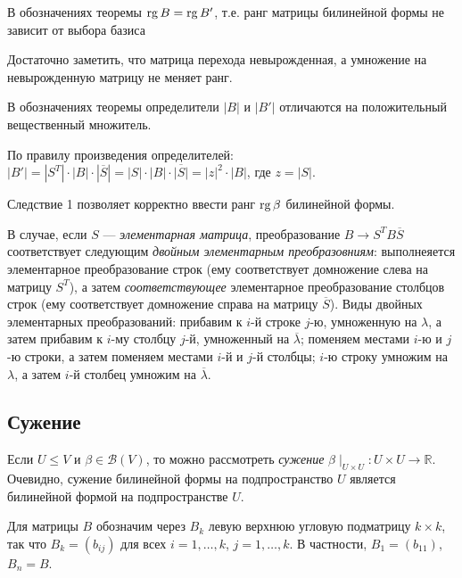 \begin{sled1}
В обозначениях теоремы $\mathop{\rm rg}\nolimits B = \mathop{\rm rg}\nolimits B'$, т.е. ранг матрицы билинейной формы не зависит от выбора базиса
\end{sled1}
\dok 
Достаточно заметить, что матрица перехода невырожденная, а умножение на невырожденную матрицу не меняет ранг.
\edok

\begin{sled2}
В обозначениях теоремы определители $|B|$ и $|B'|$ отличаются на положительный вещественный множитель.
\end{sled2}
\dok 
По правилу произведения определителей: 
 $|B'|=|S^T|\cdot |B| \cdot |\overline{S}|  = |S|\cdot |B| \cdot \overline{|S|} = |z|^2 \cdot |B|$, где $z=|S|$.
\edok

Следствие 1 позволяет корректно ввести ранг $\mathop{\rm rg}\nolimits \beta$ билинейной формы.

В случае, если $S$ --- {\it элементарная матрица}, преобразование $B\to S^TB\overline{S}$ соответствует 
следующим {\it двойным элементарным преобразовниям}: выполнеяется элементарное преобразование строк (ему соответствует домножение слева на матрицу $S^T$),
а затем {\it соответствующее} элементарное преобразование столбцов строк (ему соответствует домножение справа на матрицу $\overline{S}$).
Виды двойных элементарных преобразований: прибавим к $i$-й строке $j$-ю, умноженную на $\lambda$, 
 а затем прибавим к $i$-му столбцу $j$-й, умноженный на $\overline{\lambda}$;
поменяем местами $i$-ю и $j$-ю строки, а затем поменяем местами $i$-й и $j$-й столбцы; 
$i$-ю строку умножим на $\lambda$, а затем $i$-й столбец умножим на $\overline{\lambda}$.



\subsection{Сужение}

Если $U\leq V$ и $\beta \in \mathcal{B} (V)$, то можно рассмотреть {\it сужение} 
$\beta \mid_{U\times U}: U\times U \to \mathbb{R}$. %
Очевидно, сужение билинейной формы на подпространство $U$ является билинейной формой на подпространстве $U$.

Для матрицы $B$ обозначим через $B_k$ левую верхнюю угловую подматрицу $k\times k$, так что $B_k = (b_{ij})$
для всех $i=1, \ldots, k$, $j=1, \ldots, k$. В частности, $B_1=(b_{11})$, $B_n=B$.


